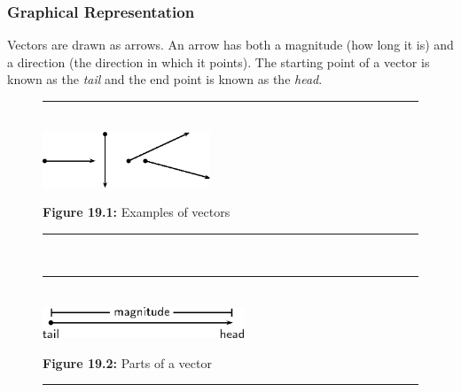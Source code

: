             \subsubsection{ Graphical Representation}
            \nopagebreak
        \label{m38812*id186285}Vectors are drawn as arrows. An arrow has both a magnitude (how long it is) and a direction (the direction in which it points). The starting point of a vector is known as the \textsl{tail} and the end point is known as the \textsl{head}.\par 
    \setcounter{subfigure}{0}
	\begin{figure}[H] %
    \begin{center}
    \rule[.1in]{\figurerulewidth}{.005in} \\
        \label{m38812*uid3!!!underscore!!!media}\label{m38812*uid3!!!underscore!!!printimage}\includegraphics[width=5cm]{col11305.imgs/m38812_PG11C1_001.png} %
      \vspace{2pt}
    \vspace{\rubberspace}\par \begin{cnxcaption}
	  \small \textbf{Figure 19.1: }Examples of vectors
	\end{cnxcaption}
    \vspace{.1in}
    \rule[.1in]{\figurerulewidth}{.005in} \\
    \end{center}
 \end{figure}       
    \setcounter{subfigure}{0}
	\begin{figure}[H] %
    \begin{center}
    \rule[.1in]{\figurerulewidth}{.005in} \\
        \label{m38812*uid4!!!underscore!!!media}\label{m38812*uid4!!!underscore!!!printimage}\includegraphics[width=6cm]{col11305.imgs/m38812_PG11C1_002.png} %
      \vspace{2pt}
    \vspace{\rubberspace}\par \begin{cnxcaption}
	  \small \textbf{Figure 19.2: }Parts of a vector
	\end{cnxcaption}
    \vspace{.1in}
    \rule[.1in]{\figurerulewidth}{.005in} \\
    \end{center}
 \end{figure}       
    \label{m38812*cid5}
